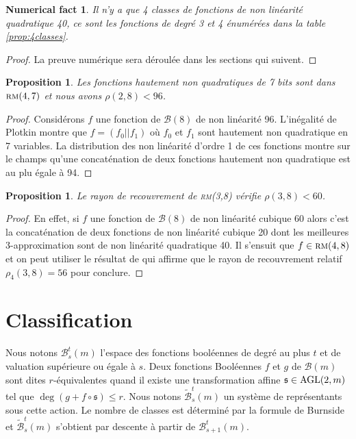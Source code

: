 \documentclass[11pt,a4paper]{article}
\def\bst(#1,#2,#3){\mathcal{B}_{#1}^{#2}(#3)}
\def\clst(#1,#2,#3){\tilde{\mathcal{B}}_{#1}^{#2}(#3)}
\def\AGL(#1,#2){ {\rm AGL}(#1,#2) }
\def\agl#1{ {\mathfrak #1 }}
\def\rmc(#1,#2){ \textsc {rm}(#1,#2) }
\def\boole(#1){\mathcal{B}(#1)}
\theoremstyle{plain}
\newtheorem{proposition}[theorem]{Proposition}
\newtheorem{result}[theorem]{Numerical fact}
\theoremstyle{definition}
\theoremstyle{remark}
\begin{document}
\begin{result} Il  n'y a que 4 classes de fonctions de non linéarité quadratique 40,
ce sont les fonctions de degré 3 et 4 énumérées dans la table \ref{prop:4classes}. 
\end{result}
\begin{proof}
	La preuve numérique sera déroulée dans les sections qui suivent.
\end{proof}

\begin{proposition}
	Les fonctions hautement non quadratiques de 7 bits sont dans $\rmc(4,7)$ et
	nous avons $\rho(2,8) < 96$.
\end{proposition}
\begin{proof}
	Considérons $f$ une fonction de $\boole(8)$ de non linéarité 96. L'inégalité de Plotkin
	montre que $f = ( f_0 || f_1 )$ où $f_0$ et $f_1$ sont hautement non quadratique en 7
	variables. La distribution des non linéarité d'ordre 1 de ces fonctions montre sur le
	champs qu'une concaténation de deux fonctions hautement non quadratique est au plu égale
	à 94.
\end{proof}

\begin{proposition}
        Le rayon de recouvrement de \rmc(3,8) vérifie $\rho(3,8) < 60$.
\end{proposition}
\begin{proof}
        En effet, si $f$ une fonction de $\boole(8)$ de non linéarité  cubique 60 alors
	c'est la concaténation de deux fonctions de non linéarité cubique 20 dont les 
	meilleures 3-approximation sont de non linéarité quadratique 40. Il s'ensuit que
	$f\in\rmc(4,8)$ et on peut utiliser le résultat de \cite{GAO} qui affirme que
        le rayon de recouvrement relatif $\rho_4(3,8) =  56$  pour conclure.
\end{proof}


\section{Classification}
\label{sec:class}

Nous notons $\bst(s,t,m)$ l'espace des fonctions booléennes
de degré au plus $t$ et de valuation supérieure ou égale à $s$.
Deux fonctions Booléennes $f$ et $g$ de $\boole(m)$ sont dites $r$-équivalentes
quand il existe une transformation affine $\agl s \in\AGL(2,m)$ tel que $\deg( g+f\circ \agl s) \leq r$. 
Nous notons $\clst(s,t,m)$ un système de représentants sous 
cette action. Le nombre de classes est déterminé par la formule 
de Burnside  et $\clst(s, t, m)$ s'obtient par descente à partir de $\bst(s+1, t, m)$.  
\end{document}
